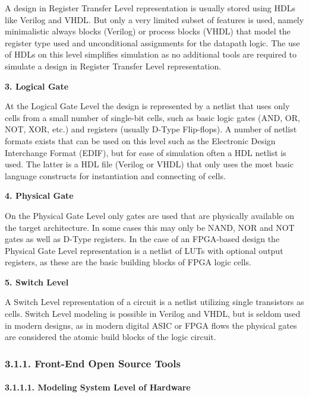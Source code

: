 \documentclass[]{article}
\let\oldparagraph\paragraph
\renewcommand{\paragraph}[1]{\oldparagraph{#1}\mbox{}}
\begin{document}
A design in Register Transfer Level representation is usually stored
using HDLs like Verilog and VHDL. But only a very limited subset of
features is used, namely minimalistic always blocks (Verilog) or process
blocks (VHDL) that model the register type used and unconditional
assignments for the datapath logic. The use of HDLs on this level
simplifies simulation as no additional tools are required to simulate a
design in Register Transfer Level representation.

\textbf{3. Logical Gate}

At the Logical Gate Level the design is represented by a netlist that
uses only cells from a small number of single-bit cells, such as basic
logic gates (AND, OR, NOT, XOR, etc.) and registers (usually D-Type
Flip-flops). A number of netlist formats exists that can be used on this
level such as the Electronic Design Interchange Format (EDIF), but for
ease of simulation often a HDL netlist is used. The latter is a HDL file
(Verilog or VHDL) that only uses the most basic language constructs for
instantiation and connecting of cells.

\textbf{4. Physical Gate}

On the Physical Gate Level only gates are used that are physically
available on the target architecture. In some cases this may only be
NAND, NOR and NOT gates as well as D-Type registers. In the case of an
FPGA-based design the Physical Gate Level representation is a netlist of
LUTs with optional output registers, as these are the basic building
blocks of FPGA logic cells.

\textbf{5. Switch Level}

A Switch Level representation of a circuit is a netlist utilizing single
transistors as cells. Switch Level modeling is possible in Verilog and
VHDL, but is seldom used in modern designs, as in modern digital ASIC or
FPGA flows the physical gates are considered the atomic build blocks of
the logic circuit.

\hypertarget{front-end-open-source-tools}{%
\subsubsection{3.1.1. Front-End Open Source
Tools}\label{front-end-open-source-tools}}

\hypertarget{modeling-system-level-of-hardware}{%
\paragraph{3.1.1.1. Modeling System Level of
Hardware}\label{modeling-system-level-of-hardware}}
\end{document}
